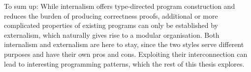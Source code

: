 To sum up:
While internalism offers type-directed program construction and reduces the burden of producing correctness proofs, additional or more complicated properties of existing programs can only be established by externalism, which naturally gives rise to a modular organisation.
Both internalism and externalism are here to stay, since the two styles serve different purposes and have their own pros and cons.
Exploiting their interconnection can lead to interesting programming patterns, which the rest of this thesis explores.